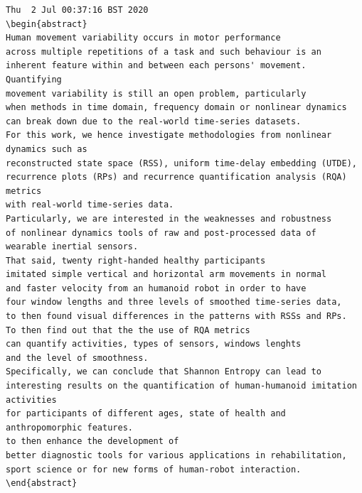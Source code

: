 \documentclass[10pt]{article}
\begin{document}
\begin{enumerate}
\begin{verbatim}
Thu  2 Jul 00:37:16 BST 2020
\begin{abstract}
Human movement variability occurs in motor performance 
across multiple repetitions of a task and such behaviour is an
inherent feature within and between each persons' movement. Quantifying
movement variability is still an open problem, particularly 
when methods in time domain, frequency domain or nonlinear dynamics 
can break down due to the real-world time-series datasets. 
For this work, we hence investigate methodologies from nonlinear dynamics such as 
reconstructed state space (RSS), uniform time-delay embedding (UTDE), 
recurrence plots (RPs) and recurrence quantification analysis (RQA) metrics
with real-world time-series data.
Particularly, we are interested in the weaknesses and robustness 
of nonlinear dynamics tools of raw and post-processed data of 
wearable inertial sensors. 
That said, twenty right-handed healthy participants 
imitated simple vertical and horizontal arm movements in normal 
and faster velocity from an humanoid robot in order to have 
four window lengths and three levels of smoothed time-series data,
to then found visual differences in the patterns with RSSs and RPs. 
To then find out that the the use of RQA metrics
can quantify activities, types of sensors, windows lenghts 
and the level of smoothness. 
Specifically, we can conclude that Shannon Entropy can lead to 
interesting results on the quantification of human-humanoid imitation activities
for participants of different ages, state of health and anthropomorphic features.
to then enhance the development of 
better diagnostic tools for various applications in rehabilitation, 
sport science or for new forms of human-robot interaction.
\end{abstract}




\end{verbatim}
\end{enumerate}
\end{document}

